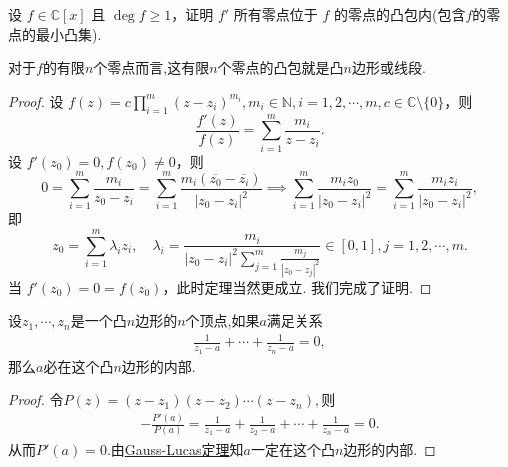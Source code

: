 \documentclass[../../main.tex]{subfiles}%
\begin{document}
\begin{theorem}\label{theorem:Gauss-Lucas定理}
设 \( f \in \mathbb{C}[x] \) 且 \( \deg f \geqslant 1 \)，证明 \( f' \) 所有零点位于 \( f \) 的零点的凸包内(包含$f$的零点的最小凸集).
\end{theorem}
\begin{remark}
对于$f$的有限$n$个零点而言,这有限$n$个零点的凸包就是凸$n$边形或线段.
\end{remark}
\begin{proof}

设 \( f(z) = c \prod_{i=1}^m (z - z_i)^{m_i}, m_i \in \mathbb{N}, i = 1,2,\cdots,m, c \in \mathbb{C} \setminus \{0\} \)，则
\[
\frac{f'(z)}{f(z)} = \sum_{i=1}^m \frac{m_i}{z - z_i}.
\]
设 \( f'(z_0) = 0, f(z_0) \neq 0 \)，则
\[
0 = \sum_{i=1}^m \frac{m_i}{z_0 - z_i} = \sum_{i=1}^m \frac{m_i (\overline{z_0} - \overline{z_i})}{|z_0 - z_i|^2} \implies \sum_{i=1}^m \frac{m_i z_0}{|z_0 - z_i|^2} = \sum_{i=1}^m \frac{m_i z_i}{|z_0 - z_i|^2},
\]
即
\[
z_0 = \sum_{i=1}^m \lambda_i z_i, \quad \lambda_i = \frac{m_i}{|z_0 - z_i|^2 \sum\limits_{j=1}^m \frac{m_j}{|z_0 - z_j|^2}} \in [0,1], j = 1,2,\cdots,m.
\]
当 \( f'(z_0) = 0 = f(z_0) \)，此时定理当然更成立. 我们完成了证明.

\end{proof}

\begin{corollary}
设$z_1,\cdots,z_n$是一个凸$n$边形的$n$个顶点,如果$a$满足关系
\begin{align*}
\frac{1}{z_1-a}+\cdots+\frac{1}{z_n-a}=0,
\end{align*}
那么$a$必在这个凸$n$边形的内部.
\end{corollary}
\begin{proof}

令$P\left( z \right) =\left( z-z_1 \right) \left( z-z_2 \right) \cdots \left( z-z_n \right),$则
\begin{align*}
-\frac{P'\left( a \right)}{P\left( a \right)}=\frac{1}{z_1-a}+\frac{1}{z_2-a}+\cdots +\frac{1}{z_n-a}=0.
\end{align*}
从而$P'\left( a \right) =0.$由\hyperref[theorem:Gauss-Lucas定理]{Gauss-Lucas定理}知$a$一定在这个凸$n$边形的内部.

\end{proof}
\end{document}
